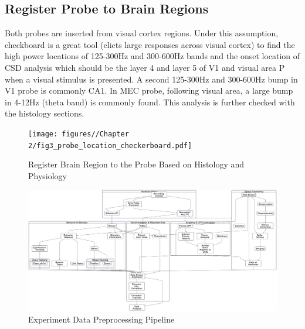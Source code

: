 \subsection{Register Probe to Brain Regions}
Both probes are inserted from visual cortex regions. Under this assumption, checkboard is a great tool (elicts large responses across visual cortex) to find the high power locations of 125-300Hz and 300-600Hz bands and the onset location of CSD analysis which should be the layer 4 and layer 5 of V1 and visual area P when a visual stimulus is presented. A second 125-300Hz and 300-600Hz bump in V1 probe is commonly CA1. In MEC probe, following visual area, a large bump in 4-12Hz (theta band) is commonly found. This analysis is further checked with the histology sections.
\begin{figure}
    \centering
    \texttt{[image: figures//Chapter 2/fig3\_probe\_location\_checkerboard.pdf]}
    \caption{Register Brain Region to the Probe Based on Histology and Physiology}
    \label{fig:placeholder}
\end{figure}


\begin{figure}
    \centering
    \includegraphics[width=1\linewidth]{figures//Chapter 2//plots/flow_chart_td.png}
    \caption{Experiment Data Preprocessing Pipeline}
    \label{fig:placeholder}
\end{figure}





